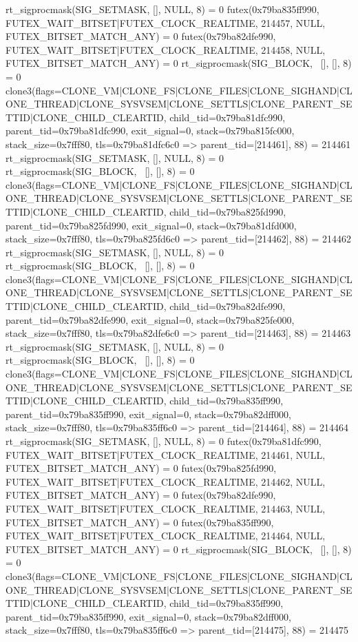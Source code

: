 \begin{breakableverbatim}
rt_sigprocmask(SIG_SETMASK, [], NULL, 8) = 0
futex(0x79ba835ff990, FUTEX_WAIT_BITSET|FUTEX_CLOCK_REALTIME, 214457, NULL, FUTEX_BITSET_MATCH_ANY) = 0
futex(0x79ba82dfe990, FUTEX_WAIT_BITSET|FUTEX_CLOCK_REALTIME, 214458, NULL, FUTEX_BITSET_MATCH_ANY) = 0
rt_sigprocmask(SIG_BLOCK, ~[], [], 8)   = 0
clone3({flags=CLONE_VM|CLONE_FS|CLONE_FILES|CLONE_SIGHAND|CLONE_THREAD|CLONE_SYSVSEM|CLONE_SETTLS|CLONE_PARENT_SETTID|CLONE_CHILD_CLEARTID, child_tid=0x79ba81dfc990, parent_tid=0x79ba81dfc990, exit_signal=0, stack=0x79ba815fc000, stack_size=0x7fff80, tls=0x79ba81dfc6c0} => {parent_tid=[214461]}, 88) = 214461
rt_sigprocmask(SIG_SETMASK, [], NULL, 8) = 0
rt_sigprocmask(SIG_BLOCK, ~[], [], 8)   = 0
clone3({flags=CLONE_VM|CLONE_FS|CLONE_FILES|CLONE_SIGHAND|CLONE_THREAD|CLONE_SYSVSEM|CLONE_SETTLS|CLONE_PARENT_SETTID|CLONE_CHILD_CLEARTID, child_tid=0x79ba825fd990, parent_tid=0x79ba825fd990, exit_signal=0, stack=0x79ba81dfd000, stack_size=0x7fff80, tls=0x79ba825fd6c0} => {parent_tid=[214462]}, 88) = 214462
rt_sigprocmask(SIG_SETMASK, [], NULL, 8) = 0
rt_sigprocmask(SIG_BLOCK, ~[], [], 8)   = 0
clone3({flags=CLONE_VM|CLONE_FS|CLONE_FILES|CLONE_SIGHAND|CLONE_THREAD|CLONE_SYSVSEM|CLONE_SETTLS|CLONE_PARENT_SETTID|CLONE_CHILD_CLEARTID, child_tid=0x79ba82dfe990, parent_tid=0x79ba82dfe990, exit_signal=0, stack=0x79ba825fe000, stack_size=0x7fff80, tls=0x79ba82dfe6c0} => {parent_tid=[214463]}, 88) = 214463
rt_sigprocmask(SIG_SETMASK, [], NULL, 8) = 0
rt_sigprocmask(SIG_BLOCK, ~[], [], 8)   = 0
clone3({flags=CLONE_VM|CLONE_FS|CLONE_FILES|CLONE_SIGHAND|CLONE_THREAD|CLONE_SYSVSEM|CLONE_SETTLS|CLONE_PARENT_SETTID|CLONE_CHILD_CLEARTID, child_tid=0x79ba835ff990, parent_tid=0x79ba835ff990, exit_signal=0, stack=0x79ba82dff000, stack_size=0x7fff80, tls=0x79ba835ff6c0} => {parent_tid=[214464]}, 88) = 214464
rt_sigprocmask(SIG_SETMASK, [], NULL, 8) = 0
futex(0x79ba81dfc990, FUTEX_WAIT_BITSET|FUTEX_CLOCK_REALTIME, 214461, NULL, FUTEX_BITSET_MATCH_ANY) = 0
futex(0x79ba825fd990, FUTEX_WAIT_BITSET|FUTEX_CLOCK_REALTIME, 214462, NULL, FUTEX_BITSET_MATCH_ANY) = 0
futex(0x79ba82dfe990, FUTEX_WAIT_BITSET|FUTEX_CLOCK_REALTIME, 214463, NULL, FUTEX_BITSET_MATCH_ANY) = 0
futex(0x79ba835ff990, FUTEX_WAIT_BITSET|FUTEX_CLOCK_REALTIME, 214464, NULL, FUTEX_BITSET_MATCH_ANY) = 0
rt_sigprocmask(SIG_BLOCK, ~[], [], 8)   = 0
clone3({flags=CLONE_VM|CLONE_FS|CLONE_FILES|CLONE_SIGHAND|CLONE_THREAD|CLONE_SYSVSEM|CLONE_SETTLS|CLONE_PARENT_SETTID|CLONE_CHILD_CLEARTID, child_tid=0x79ba835ff990, parent_tid=0x79ba835ff990, exit_signal=0, stack=0x79ba82dff000, stack_size=0x7fff80, tls=0x79ba835ff6c0} => {parent_tid=[214475]}, 88) = 214475

\end{breakableverbatim}
